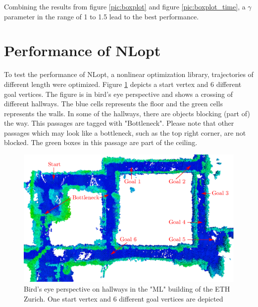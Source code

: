 Combining the results from figure \ref{pic:boxplot} and figure \ref{pic:boxplot_time}, a $\gamma$ parameter in the range of 1 to 1.5 lead to the best performance.




\section{Performance of NLopt}

To test the performance of NLopt, a nonlinear optimization library, trajectories of different length were optimized. Figure \ref{pic:differentGoal} depicts a start vertex and 6 different goal vertices. The figure is in bird's eye perspective and shows a crossing of different hallways. The blue cells represents the floor and the green cells represents the walls. 
 In some of the hallways, there are objects blocking (part of) the way. This passages are tagged with "Bottleneck". Please note that other passages which may look like a bottleneck, such as the top right corner, are not blocked. The green boxes in this passage are part of the ceiling.

\begin{figure}[H]
   \centering
   \includegraphics[trim = 0mm 15mm 0mm 0mm,clip,width=1\textwidth]{pics/ML4.eps}
   \caption{Bird's eye perspective on hallways in the "ML" building of the ETH Zurich. One start vertex and 6 different goal vertices are depicted}
   \label{pic:differentGoal}
\end{figure}

%
%

